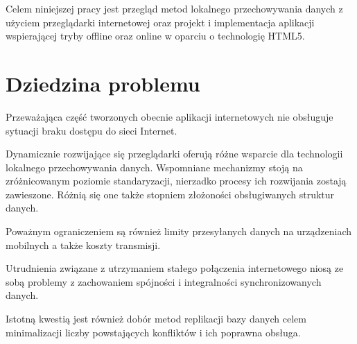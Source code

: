 Celem niniejszej pracy jest przegląd metod lokalnego przechowywania danych z użyciem przeglądarki internetowej oraz projekt i implementacja aplikacji wspierającej tryby offline oraz online w oparciu o technologię HTML5\cite{html5}.

\section{Dziedzina problemu}
\label{sec:dziedzinaProblemu}

Przeważająca część tworzonych obecnie aplikacji internetowych nie obsługuje sytuacji braku dostępu do sieci Internet. 

Dynamicznie rozwijające się przeglądarki oferują różne wsparcie dla technologii lokalnego przechowywania danych. Wspomniane mechanizmy stoją na zróżnicowanym poziomie standaryzacji, nierzadko procesy ich rozwijania zostają zawieszone. Różnią się one także stopniem złożoności obsługiwanych struktur danych.

Poważnym ograniczeniem są również limity przesyłanych danych na urządzeniach mobilnych a także koszty transmisji.

Utrudnienia związane z utrzymaniem stałego połączenia internetowego niosą ze sobą problemy z zachowaniem spójności i integralności synchronizowanych danych.

Istotną kwestią jest również dobór metod replikacji bazy danych celem minimalizacji liczby powstających konfliktów i ich poprawna obsługa.
